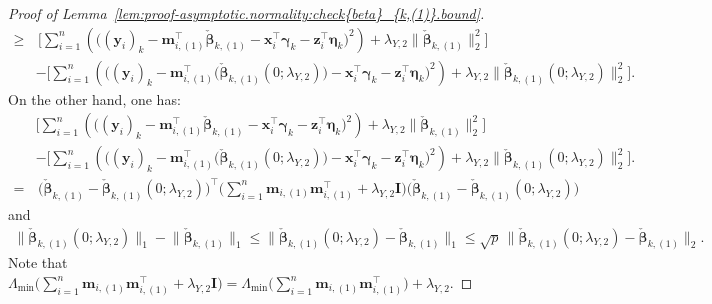 \documentclass[
  12pt]{article}
\def\M{\mathbf{m}}
\def\X{\mathbf{x}}
\def\Y{\mathbf{y}}
\def\Z{\mathbf{z}}
\begin{document}
\begin{proof}[Proof of Lemma~\ref{lem:proof-asymptotic.normality:check{beta}_{k,(1)}.bound}]
\begin{align}
		\geq  &  \,   
		\Big[     \sum_{i=1}^{n}  \left(   \big(  (\Y_{i})_{k}   -    \M_{i,(1)}^{\top} \check{\bm{\beta}}_{k,(1)}  -   \X_{i}^{\top} \bm{\gamma}_{k}   -   \Z_{i}^{\top} \bm{\eta}_{k}     
		\big)^{2}   
		\right)   
		+   \lambda_{Y,2}    \big\|   \check{\bm{\beta}}_{k,(1)}    \big\|_{2}^{2} \Big]  
		\\
		& - \Big[ \sum_{i=1}^{n}  \left(   \big(  (\Y_{i})_{k}   -      \M_{i,(1)}^{\top}\big(   \check{\bm{\beta}}_{k,(1)} (  0 ; \lambda_{Y,2}  )   \big)  -   \X_{i}^{\top} \bm{\gamma}_{k}   -   \Z_{i}^{\top} \bm{\eta}_{k}     
		\big)^{2}   
		\right)   
		+   \lambda_{Y,2}    \big\|   \check{\bm{\beta}}_{k,(1)} ( 0 ; \lambda_{Y,2}  )    \big\|_{2}^{2} \Big]    .  
		\nonumber   
	\end{align}   
	On the other hand, one has: 
	\begin{align*}
		&\Big[ \sum_{i=1}^{n}  \left(   \big(  (\Y_{i})_{k}   -    \M_{i,(1)}^{\top} \check{\bm{\beta}}_{k,(1)}  -   \X_{i}^{\top} \bm{\gamma}_{k}   -   \Z_{i}^{\top} \bm{\eta}_{k}     
		\big)^{2}   
		\right)   
		+   \lambda_{Y,2}    \big\|   \check{\bm{\beta}}_{k,(1)}    \big\|_{2}^{2} \Big]  
		\\
		& - \Big[  \sum_{i=1}^{n}  \left(   \big(  (\Y_{i})_{k}   -      \M_{i,(1)}^{\top}\big(   \check{\bm{\beta}}_{k,(1)} (  0 ; \lambda_{Y,2}  )   \big)  -   \X_{i}^{\top} \bm{\gamma}_{k}   -   \Z_{i}^{\top} \bm{\eta}_{k}     
		\big)^{2}   
		\right)   
		+   \lambda_{Y,2}    \big\|   \check{\bm{\beta}}_{k,(1)} ( 0 ; \lambda_{Y,2}  )    \big\|_{2}^{2} \Big]    .  
		\\
		=& \, \Big( \check{\bm{\beta}}_{k,(1)}  - \check{\bm{\beta}}_{k,(1)} (0 ; \lambda_{Y,2})  \Big)^{\top}  
		\Big( \sum_{i=1}^{n} \M_{i,(1)} \M_{i,(1)}^{\top}   
		+ \lambda_{Y,2} \mathbf{I}  \Big) 
		\Big( \check{\bm{\beta}}_{k,(1)}  - \check{\bm{\beta}}_{k,(1)} (0 ; \lambda_{Y,2})  \Big)
	\end{align*}   
	and 
	\begin{align*}
		\big\|   \check{\bm{\beta}}_{k,(1)} (0;\lambda_{Y,2})    \big\|_{1}   -    \big\|   \check{\bm{\beta}}_{k,(1)}    \big\|_{1}    \leq   \big\|   \check{\bm{\beta}}_{k,(1)}   (0;\lambda_{Y,2})      -   \check{\bm{\beta}}_{k,(1)}    \big\|_{1}  \leq  \sqrt{p}  \,   \big\|   \check{\bm{\beta}}_{k,(1)} (0;\lambda_{Y,2})      -   \check{\bm{\beta}}_{k,(1)}    \big\|_{2} . 
	\end{align*}  
	Note that $\Lambda_{\min} \big(  \sum_{i=1}^{n} \M_{i,(1)} \M_{i,(1)}^{\top}  + \lambda_{Y,2} \mathbf{I} \big) = \Lambda_{\min} \big(  \sum_{i=1}^{n} \M_{i,(1)} \M_{i,(1)}^{\top} \big)  + \lambda_{Y,2}  $. 

\end{proof}
\end{document}

